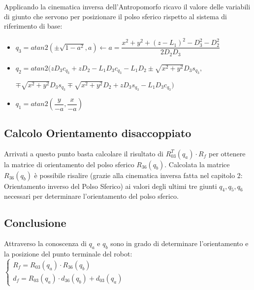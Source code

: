 \documentclass[a4paper,12pt]{article}
\begin{document}
Applicando la cinematica inversa dell'Antropomorfo ricavo il valore delle variabili di giunto che servono per posizionare il polso sferico rispetto al sistema di riferimento di base:
\begin{itemize}
\item $q_3 = atan2(\pm\sqrt{1-a^2},a) \leftarrow a=\dfrac{x^2+y^2+(z-L_1)^2-D_3^2-D_2^2}{2D_2D_3}$
\item $q_2 = atan2(zD_3c_{q_3} + zD_2 - L_1D_3c_{q_3} - L_1D_2 \pm \sqrt{x^2+y^2}D_3s_{q_3},$

\hspace{20mm} $ \mp \sqrt{x^2+y^2}D_3s_{q_3} \mp \sqrt{x^2+y^2}D_2 + zD_3s_{q_3} - L_1D_3c_{q_3})$
\item $q_1 = atan2(\dfrac{y}{-a},\dfrac{x}{-a})$
\end{itemize}

\subsection{Calcolo Orientamento disaccoppiato}
Arrivati a questo punto basta calcolare il risultato di $ R_{03}^T(q_a) \cdot R_f $ per ottenere la matrice di orientamento del polso sferico $R_{36}(q_b)$. Calcolata la matrice $R_{36}(q_b)$ è possibile risalire (grazie alla cinematica inversa fatta nel capitolo 2: Orientamento inverso del Polso Sferico) ai valori degli ultimi tre giunti $q_4,q_5,q_6$ necessari per determinare l'orientamento del polso sferico.

\subsection{Conclusione}
Attraverso la conoscenza di $q_a$ e $q_b$ sono in grado di determinare l'orientamento e la posizione del punto terminale del robot:\\

		$\left\{ \begin{array} {ll} %
		R_f  = R_{03}(q_a) \cdot  R_{36}(q_b) \\
		d_f = R_{03}(q_a) \cdot d_{36}(q_b) + d_{03}(q_a)
		\end{array}
		\right.$
\end{document}
